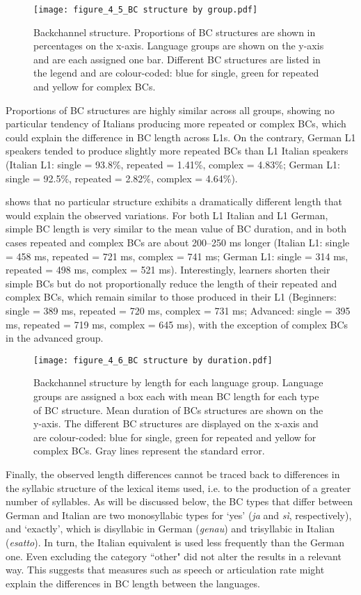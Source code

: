 \begin{figure}
\texttt{[image: figure\_4\_5\_BC structure by group.pdf]}
\caption{Backchannel structure. Proportions of BC structures are shown in percentages on the x-axis. Language groups are shown on the y-axis and are each assigned one bar. Different BC structures are listed in the legend and are colour-coded: blue for single, green for repeated and yellow for complex BCs.}
\label{fig:4.5}
\end{figure}

Proportions of BC structures are highly similar across all groups, showing no particular tendency of Italians producing more repeated or complex BCs, which could explain the difference in BC length across L1s. On the contrary, German L1 speakers tended to produce slightly more repeated BCs than L1 Italian speakers (Italian L1: single = 93.8\%, repeated = 1.41\%, complex = 4.83\%; German L1: single = 92.5\%, repeated = 2.82\%, complex = 4.64\%).

 shows that no particular structure exhibits a dramatically different length that would explain the observed variations. For both L1 Italian and L1 German, simple BC length is very similar to the mean value of BC duration, and in both cases repeated and complex BCs are about 200–250 ms longer (Italian L1: single = 458 ms, repeated = 721 ms, complex = 741 ms; German L1: single = 314 ms, repeated = 498 ms, complex = 521 ms). Interestingly, learners shorten their simple BCs but do not proportionally reduce the length of their repeated and complex BCs, which remain similar to those produced in their L1 (Beginners: single = 389 ms, repeated = 720 ms, complex = 731 ms; Advanced: single = 395 ms, repeated = 719 ms, complex = 645 ms), with the exception of complex BCs in the advanced group.

\begin{figure}
\texttt{[image: figure\_4\_6\_BC structure by duration.pdf]}
\caption{Backchannel structure by length for each language group. Language groups are assigned a box each with mean BC length for each type of BC structure. Mean duration of BCs structures are shown on the y-axis. The different BC structures are displayed on the x-axis and are colour-coded: blue for single, green for repeated and yellow for complex BCs. Gray lines represent the standard error.}
\label{fig:4.6}
\end{figure}

Finally, the observed length differences cannot be traced back to differences in the syllabic structure of the lexical items used, i.e. to the production of a greater number of syllables. As will be discussed below, the BC types that differ between German and Italian are two monosyllabic types for ‘yes’ (\textit{ja} and \textit{sì}, respectively), and ‘exactly’,  which is disyllabic in German (\textit{genau}) and trisyllabic in Italian (\textit{esatto}). In turn, the Italian equivalent is used less frequently than the German one. Even excluding the category ``other" did not alter the results in a relevant way. This suggests that measures such as speech or articulation rate might explain the differences in BC length between the languages.

